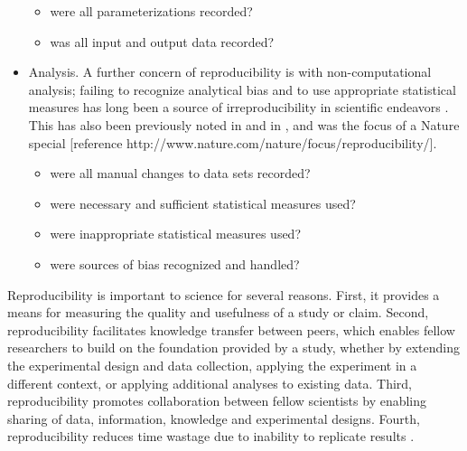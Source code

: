 \begin{itemize}
\begin{itemize}
     \item were all parameterizations recorded?
     \item was all input and output data recorded?
  \end{itemize}
  \item Analysis.  A further concern of reproducibility is with 
  non-computational analysis; failing to recognize analytical bias and to 
  use appropriate statistical measures has long been a source of 
  irreproducibility in scientific endeavors \cite{sackett1979bias}.
  This has also been previously noted in \cite{ioannidis2005most} 
  and in \cite{nuzzo2014statistical}, 
  and was the focus of a Nature special [reference http://www.nature.com/nature/focus/reproducibility/].
  \begin{itemize}
     \item were all manual changes to data sets recorded?
     \item were necessary and sufficient statistical measures used?
     \item were inappropriate statistical measures used?
     \item were sources of bias recognized and handled?
  \end{itemize}
\end{itemize}

Reproducibility is important to science for several reasons.  First, it 
provides a means for measuring the quality and usefulness of a study or 
claim.  Second, reproducibility facilitates knowledge transfer between 
peers, which enables fellow researchers to build on the foundation provided 
by a study, whether by extending the experimental design and data collection, 
applying the experiment in a different context, or applying additional analyses 
to existing data.  Third, reproducibility promotes collaboration between fellow 
scientists by enabling sharing of data, information, knowledge and experimental 
designs.  Fourth, reproducibility reduces time wastage due to inability to 
replicate results \cite{ioannidis2005most, mullard2011reliability}. 


